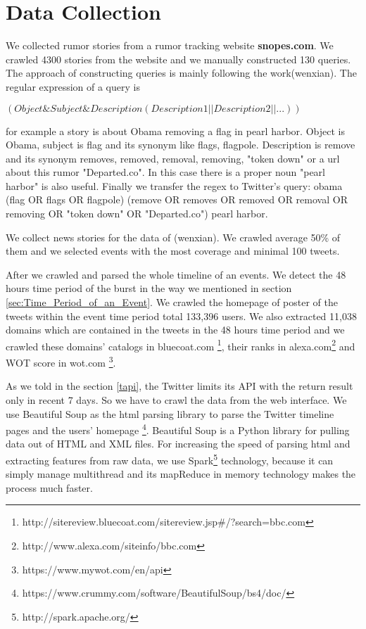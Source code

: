  
\chapter{Data Collection} %
\label{cha:Data_Collection}
We collected rumor stories from a rumor tracking website \textbf{snopes.com}. We crawled 4300 stories from the website and we manually constructed 130 queries. The approach of constructing queries is mainly following the work(wenxian). The regular expression of a query is 

$(Object \& Subject \& Description(Description1||Description2||...))$


for example a story is about Obama removing a flag in pearl harbor. Object is Obama, subject is flag and its synonym like flags, flagpole. Description is remove and its synonym removes, removed, removal, removing, "token down" or a url about this rumor "Departed.co". In this case there is a proper noun "pearl harbor" is also useful. Finally we transfer the regex to Twitter's query: obama (flag OR flags OR flagpole) (remove OR removes OR removed OR removal OR removing OR "token down" OR "Departed.co") pearl harbor.



We collect news stories for the data of (wenxian). We crawled average 50\% of them and we selected events with the most coverage and minimal 100 tweets. 

After we crawled and parsed the whole timeline of an events. We detect the 48 hours time period of the burst in the way we mentioned in section \ref{sec:Time_Period_of_an_Event}. We crawled the homepage of poster of the tweets within the event time period total 133,396 users. We also extracted 11,038 domains which are contained in the tweets in the 48 hours time period and we crawled these domains' catalogs in bluecoat.com \footnote{http://sitereview.bluecoat.com/sitereview.jsp\#/?search=bbc.com}, their ranks in alexa.com\footnote{http://www.alexa.com/siteinfo/bbc.com} and WOT score in wot.com \footnote{https://www.mywot.com/en/api}. 

As we told in the section \ref{tapi}, the Twitter limits its API with the return result only in recent 7 days. So we have to crawl the data from the web interface. We use Beautiful Soup as the html parsing library to parse the Twitter timeline pages and the users' homepage \footnote{https://www.crummy.com/software/BeautifulSoup/bs4/doc/}. Beautiful Soup is a Python library for pulling data out of HTML and XML files. For increasing the speed of parsing html and extracting features from raw data, we use Spark\footnote{http://spark.apache.org/} technology, because it can simply manage multithread and its mapReduce in memory technology makes the process much faster.  
